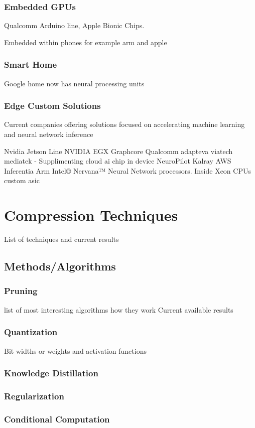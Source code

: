 \subsubsection{Embedded GPUs}
Qualcomm Arduino line, Apple Bionic Chips.

Embedded within phones for example arm and apple
\subsubsection{Smart Home}
Google home now has neural processing units
\subsubsection{Edge Custom Solutions}
Current companies offering solutions focused on accelerating machine learning and neural network inference

Nvidia Jetson Line
NVIDIA EGX
Graphcore
Qualcomm
adapteva
viatech
mediatek - Supplimenting cloud ai chip in device NeuroPilot
Kalray
AWS Inferentia
Arm
Intel® Nervana™ Neural Network processors. Inside Xeon CPUs
custom asic

\section{Compression Techniques}
List of techniques and current results
\subsection{Methods/Algorithms}
\subsubsection{Pruning}
list of most interesting algorithms
how they work
Current available results
\subsubsection{Quantization}
Bit widths or weights and activation functions
\subsubsection{Knowledge Distillation}
\subsubsection{Regularization}
\subsubsection{Conditional Computation}

